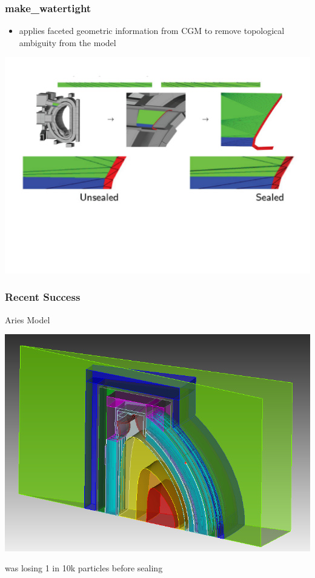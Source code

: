 \documentclass[14pt]{beamer}
\begin{document}
\begin{frame}
\frametitle{make\_watertight}
\begin{itemize}
\item applies faceted geometric information from CGM to remove topological ambiguity from the model
\end{itemize}
\includegraphics[scale=0.4, trim = 20 50 0 0]{sealing_ex.png}
\end{frame}




\begin{frame}
\frametitle{Recent Success}

Aries Model
\begin{center}
\includegraphics[scale=0.3]{sic.png}
\end{center}
was losing 1 in 10k particles before sealing
\end{frame}
\end{document}

